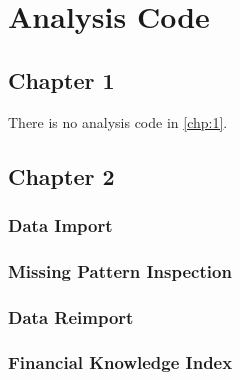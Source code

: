 \chapter{Analysis Code}

\section{Chapter 1}

There is no analysis code in \cref{chp:1}.

\section{Chapter 2}

\subsection{Data Import} \label{R.import}
\begin{singlespace}\small
    
\end{singlespace}

\subsection{Missing Pattern Inspection} \label{R.missing}
\begin{singlespace}\small
    
\end{singlespace}

\subsection{Data Reimport} \label{R.reimport}
\begin{singlespace}\small
    
\end{singlespace}

\subsection{Financial Knowledge Index} \label{R.fki}
\begin{singlespace}\small
    
\end{singlespace}
